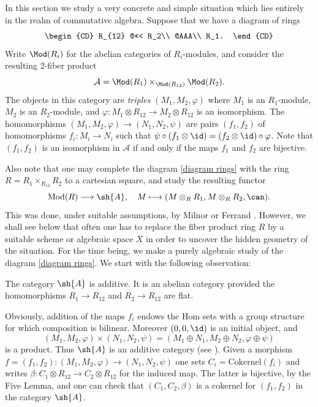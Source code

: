 \documentclass[12pt]{amsart}
\newcommand{\catA}{\mathcal{A}}
\newcommand{\lra}{\longrightarrow}
\newcommand{\ra}{\rightarrow}
\begin{document}
In this section we study a very concrete and simple situation which lies entirely in the realm of commutative algebra. Suppose that we have a diagram of rings
\begin{equation}
\label{diagram rings}
\begin{CD}
R_{12}	@<<<	R_2\\
@AAA\\
R_1.
\end{CD}
\end{equation}
Write $\Mod(R_i)$ for the abelian categories of $R_i$-modules, and consider the resulting  2-fiber product  
$$
\catA=\Mod(R_1)\times_{\Mod(R_{12})} \Mod(R_2).
$$
The objects  in this category are \emph{triples} $(M_1,M_2,\varphi)$ where $M_1$ is an $R_1$-module, $M_2$ is an $R_2$-module,
and $\varphi:M_1\otimes R_{12}\ra M_2\otimes R_{12}$ is an isomorphism.
The homomorphisms $(M_1,M_2,\varphi)\ra (N_1,N_2,\psi)$ are pairs $(f_1,f_2)$ of homomorphisms 
$f_i:M_i\ra N_i$ such that $\psi\circ (f_1\otimes\id) = (f_2\otimes\id)\circ\varphi$.
Note that $(f_1,f_2)$ is an isomorphism in $\catA$ if and only if the maps $f_1$ and $f_2$ are bijective. 

Also note  that one may complete the diagram \eqref{diagram rings} with the ring $R=R_1\times_{R_{12}} R_2$ to a cartesian square,
and study the resulting functor 
$$
\text{Mod}(R) \lra \sh{A},\quad M\longmapsto (M\otimes_R R_1, M\otimes_R R_2,\can).
$$
This was done, under suitable assumptions,  by Milnor \cite[Sec. 2]{MR0349811} or Ferrand \cite[Sec. 5]{MR2044495}. However, we shall see below that often one has to replace the fiber product ring $R$ by a suitable scheme or algebraic space $X$ in order to uncover the hidden geometry of the situation. For the time being, we make a purely algebraic study of the diagram \eqref{diagram rings}. We start with the following observation:

\begin{proposition}
\label{abelian category}
The category $\sh{A}$ is additive. It is an abelian category provided the 
 homomorphisms $R_1\ra R_{12}$ and $R_2\ra R_{12}$ are flat.  
\end{proposition}

\proof
Obviously, addition of the maps $f_i$ endows the Hom sets with a group structure for which composition is bilinear.
Moreover $(0,0,\id)$ is an initial object, and 
$$
(M_1,M_2,\varphi)\times (N_1,N_2,\psi) = (M_1\oplus N_1, M_2\oplus N_2, \varphi\oplus\psi)
$$
is a product. Thus $\sh{A}$ is an additive category (see \cite[Lem. 8.2.9]{MR2182076}).
Given a  morphism $f=(f_1,f_2):(M_1,M_2,\varphi)\ra (N_1,N_2,\psi)$ one sets $C_i=\text{Cokernel}(f_i)$
and writes $\beta:C_1\otimes R_{12}\ra C_2\otimes R_{12}$ for the induced map. The latter is bijective, by the Five Lemma,
and one can check that $(C_1,C_2,\beta)$ is a cokernel for $(f_1,f_2)$ in the category $\sh{A}$. 
\end{document}
